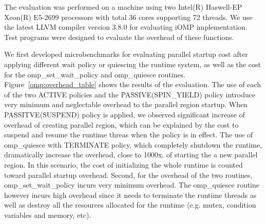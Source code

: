 The evaluation was performed on a machine using two Intel(R) Haswell-EP Xeon(R) E5-2699 processors with total 36 cores supporting 72 threads. We use the latest
LLVM compiler version 3.8.0 for evaluating iOMP implementation. Test programs were designed to evaluate the overhead of these functions. 

We first developed microbenchmarks for evaluating parallel startup cost after applying different wait policy or 
quiescing the runtime system, as well as the cost for the {\sf omp\_set\_wait\_policy} and {\sf omp\_quiesce} 
routines.  
Figure~\ref{omp:overhead_table} shows the results of the evaluation. 
The use of each of the two {\sf ACTIVE} policies and the PASSIVE(SPIN\_YIELD) policy 
introduce very minimum and neglectable overhead to the {\sf parallel} region startup. 
When PASSITVE(SUSPEND) policy is applied, we observed significant increase of overhead of creating parallel region, 
which can be explained by the cost to suspend and resume the runtime threas when the policy is in effect. 
The use of {\sf omp\_quiesce} with TERMINATE policy, which completely shutdown the 
runtime, dramatically increase the overhead, close to 1000x, of starting the a new parallel region. In this 
scenario, the cost of initializing the whole runtime is counted toward {\sf parallel} startup overhead. Second, 
for the overhead of the two routines, {\sf omp\_set\_wait\_policy} incurs very minimum overhead. The 
{\sf omp\_quiesce} routine however incurs high overhead since it needs to terminate the runtime threads as well as 
destroy all the resources allocated for the runtime (e.g. mutex, condition variables and memory, etc). 



